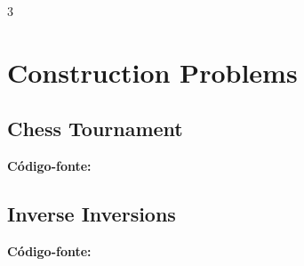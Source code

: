 \documentclass[8pt]{extarticle}
\begin{document}
\pagebreak
\begin{multicols*}{3}

\section{Construction Problems}

\subsection{Chess Tournament}
\begin{caixaenunciado}

\end{caixaenunciado}
\vspace{0.3cm}
\noindent\textbf{Código-fonte:}


\subsection{Inverse Inversions}
\begin{caixaenunciado}

\end{caixaenunciado}
\vspace{0.3cm}
\noindent\textbf{Código-fonte:}

\end{multicols*}
\pagebreak
\end{document}
